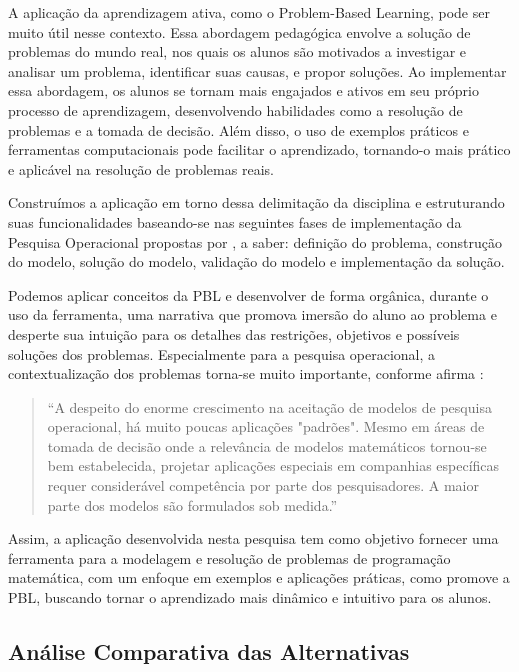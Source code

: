 \documentclass{article}
\begin{document}
A aplicação da aprendizagem ativa, como o Problem-Based Learning, pode ser muito útil nesse contexto. Essa abordagem pedagógica envolve a solução de problemas do mundo real, nos quais os alunos são motivados a investigar e analisar um problema, identificar suas causas, e propor soluções. Ao implementar essa abordagem, os alunos se tornam mais engajados e ativos em seu próprio processo de aprendizagem, desenvolvendo habilidades como a resolução de problemas e a tomada de decisão. Além disso, o uso de exemplos práticos e ferramentas computacionais pode facilitar o aprendizado, tornando-o mais prático e aplicável na resolução de problemas reais.

Construímos a aplicação em torno dessa delimitação da disciplina e estruturando suas funcionalidades baseando-se nas seguintes fases de implementação da Pesquisa Operacional propostas por , a saber: definição do problema, construção do modelo, solução do modelo, validação do modelo e implementação da solução.

Podemos aplicar conceitos da PBL e desenvolver de forma orgânica, durante o uso da ferramenta, uma narrativa que promova imersão do aluno ao problema e desperte sua intuição para os detalhes das restrições, objetivos e possíveis soluções dos problemas. Especialmente para a pesquisa operacional, a contextualização dos problemas torna-se muito importante, conforme afirma :
\begin{flushright}
    \begin{quote}
    ``A despeito do enorme crescimento na aceitação de modelos de pesquisa operacional, há muito poucas aplicações "padrões". Mesmo em áreas de tomada de decisão onde a relevância de modelos matemáticos tornou-se bem estabelecida, projetar aplicações especiais em companhias específicas requer considerável competência por parte dos pesquisadores. A maior parte dos modelos são formulados sob medida.''
    \end{quote}
\end{flushright}

Assim, a aplicação desenvolvida nesta pesquisa tem como objetivo fornecer uma ferramenta para a modelagem e resolução de problemas de programação matemática, com um enfoque em exemplos e aplicações práticas, como promove a PBL, buscando tornar o aprendizado mais dinâmico e intuitivo para os alunos.

\subsection{Análise Comparativa das Alternativas}
\end{document}
